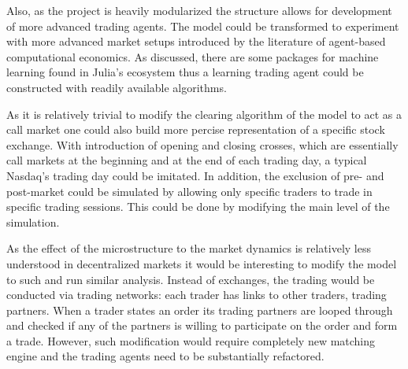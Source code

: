 Also, as the project is heavily modularized the structure allows for development of more advanced
trading agents. The model could be transformed to experiment with more advanced
market setups introduced by the literature of agent-based computational economics. As discussed,
there are some packages for machine learning found in Julia's ecosystem thus 
a learning trading agent could be constructed with readily available algorithms.

As it is relatively trivial to modify the clearing algorithm of the model to 
act as a call market one could also build more percise representation of a
specific stock exchange. With introduction of opening and closing crosses,
which are essentially call markets at the beginning and at the end of each 
trading day, a typical Nasdaq's trading day could be imitated. In addition,
the exclusion of pre- and post-market could be simulated by allowing only
specific traders to trade in specific trading sessions. This could be done
by modifying the main level of the simulation. 

As the effect of the microstructure to the market dynamics is relatively 
less understood in decentralized markets it would be interesting to modify 
the model to such and run similar analysis. Instead of exchanges, the trading 
would be conducted via trading networks: each trader has links to other traders, 
trading partners. When a trader states an order its trading partners are 
looped through and checked if any of the partners is willing to participate 
on the order and form a trade. However, such modification would require 
completely new matching engine and the trading agents need to be substantially 
refactored.
